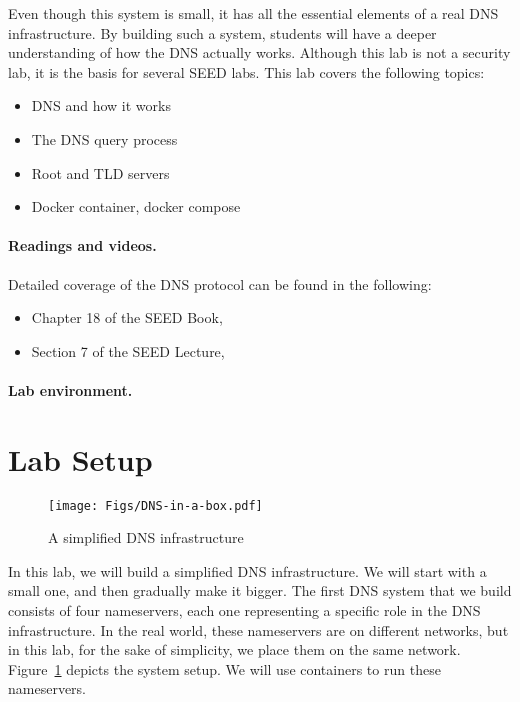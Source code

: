 Even though this system is small, it has all the essential
elements of a real DNS infrastructure. By building such a system,
students will have a deeper understanding of how the DNS actually works. 
Although this lab is not a security lab, it is the basis for
several SEED labs. This lab covers the following topics:

\begin{itemize}[noitemsep]
\item DNS and how it works
\item The DNS query process
\item Root and TLD servers
\item Docker container, docker compose
\end{itemize}



\paragraph{Readings and videos.}
Detailed coverage of the DNS protocol can be found in the following:

\begin{itemize}
\item Chapter 18 of the SEED Book, \seedbook
\item Section 7 of the SEED Lecture, \seedisvideo
\end{itemize}


\paragraph{Lab environment.} 
\seedenvironmentB
\nodependency





\section{Lab Setup} 


\begin{figure}[htb]
\begin{center}
\texttt{[image: Figs/DNS-in-a-box.pdf]}
\end{center}
\caption{A simplified DNS infrastructure}
\label{dns:fig:dns-in-a-box}
\end{figure}


In this lab, we will build a simplified DNS infrastructure. We will
start with a small one, and then gradually make it bigger. 
The first DNS system that we build 
consists of four nameservers, each one representing 
a specific role in the DNS infrastructure. 
In the real world, these nameservers are on different 
networks, but in this lab, for the sake of simplicity, we place them
on the same network. 
Figure~\ref{dns:fig:dns-in-a-box} depicts the system setup. 
We will use containers to run these nameservers. 


